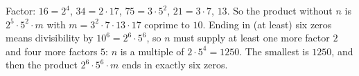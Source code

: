Factor: $16=2^4$, $34=2\cdot17$, $75=3\cdot5^2$, $21=3\cdot7$, $13$. So the product without $n$ is $2^5\cdot5^2\cdot m$ with $m=3^2\cdot7\cdot13\cdot17$ coprime to $10$. Ending in (at least) six zeros means divisibility by $10^6=2^6\cdot5^6$, so $n$ must supply at least one more factor $2$ and four more factors $5$: $n$ is a multiple of $2\cdot5^4=1250$. The smallest is $\boxed{1250}$, and then the product $2^6\cdot5^6\cdot m$ ends in exactly six zeros.
